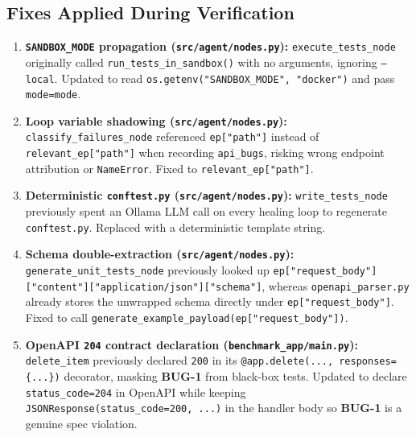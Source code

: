 \documentclass[11pt,a4paper]{article}
\begin{document}
\subsection{Fixes Applied During Verification}
\begin{enumerate}[leftmargin=1.5em]
    \item \textbf{\texttt{SANDBOX\_MODE} propagation (\texttt{src/agent/nodes.py}):} \texttt{execute\_tests\_node} originally called \texttt{run\_tests\_in\_sandbox()} with no arguments, ignoring \texttt{--local}. Updated to read \texttt{os.getenv("SANDBOX\_MODE", "docker")} and pass \texttt{mode=mode}.
    \item \textbf{Loop variable shadowing (\texttt{src/agent/nodes.py}):} \texttt{classify\_failures\_node} referenced \texttt{ep["path"]} instead of \texttt{relevant\_ep["path"]} when recording \texttt{api\_bugs}, risking wrong endpoint attribution or \texttt{NameError}. Fixed to \texttt{relevant\_ep["path"]}.
    \item \textbf{Deterministic \texttt{conftest.py} (\texttt{src/agent/nodes.py}):} \texttt{write\_tests\_node} previously spent an Ollama LLM call on every healing loop to regenerate \texttt{conftest.py}. Replaced with a deterministic template string.
    \item \textbf{Schema double-extraction (\texttt{src/agent/nodes.py}):} \texttt{generate\_unit\_tests\_node} previously looked up \texttt{ep["request\_body"]["content"]["application/json"]["schema"]}, whereas \texttt{openapi\_parser.py} already stores the unwrapped schema directly under \texttt{ep["request\_body"]}. Fixed to call \texttt{generate\_example\_payload(ep["request\_body"])}.
    \item \textbf{OpenAPI \texttt{204} contract declaration (\texttt{benchmark\_app/main.py}):} \texttt{delete\_item} previously declared \texttt{200} in its \texttt{@app.delete(..., responses=\{...\})} decorator, masking \textbf{BUG-1} from black-box tests. Updated to declare \texttt{status\_code=204} in OpenAPI while keeping \texttt{JSONResponse(status\_code=200, ...)} in the handler body so \textbf{BUG-1} is a genuine spec violation.
\end{enumerate}
\end{document}
